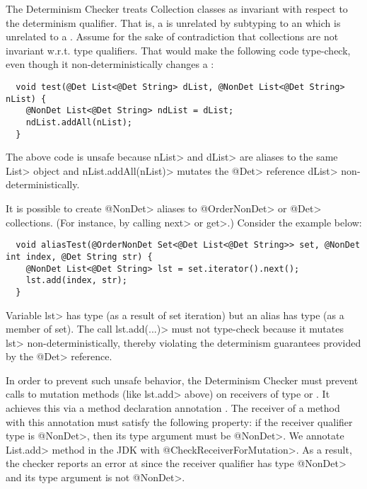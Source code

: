 The Determinism Checker treats Collection classes as
invariant with respect to the determinism qualifier. That is, a
 is unrelated by subtyping to an 
which is unrelated to a .
Assume for the sake of contradiction that collections are not invariant w.r.t. type qualifiers.
That would make the following code type-check, even though it
non-deterministically changes a :
\begin{Verbatim}
  void test(@Det List<@Det String> dList, @NonDet List<@Det String> nList) {
    @NonDet List<@Det String> ndList = dList;
    ndList.addAll(nList);
  }
\end{Verbatim}

The above code is unsafe because \<nList> and \<dList> are aliases to
the same \<List> object and \<nList.addAll(nList)> mutates the \<@Det>
reference \<dList> non-deterministically.

It is possible to create \<@NonDet> aliases to \<@OrderNonDet> or \<@Det> collections.
(For instance, by calling \<next> or \<get>.) Consider the example below:
\begin{Verbatim}
  void aliasTest(@OrderNonDet Set<@Det List<@Det String>> set, @NonDet int index, @Det String str) {
    @NonDet List<@Det String> lst = set.iterator().next();
    lst.add(index, str);
  }
\end{Verbatim}

Variable \<lst> has type  (as a result of set iteration)
but an alias has type  (as a member of set).
The call \<lst.add(...)> must not type-check because it mutates \<lst> non-deterministically,
thereby violating the determinism guarantees provided by the \<@Det> reference.

In order to prevent such unsafe behavior, the Determinism Checker must
prevent calls to mutation methods (like \<lst.add> above) on receivers of
type  or .
It achieves this via a method declaration annotation
.
The receiver of a method with this annotation must satisfy the following property: if the
receiver qualifier type is \<@NonDet>, then its type argument must be \<@NonDet>.
We annotate \<List.add> method in the JDK with \<@CheckReceiverForMutation>.
As a result, the checker reports an error at 
since the receiver qualifier has type \<@NonDet> and its type argument is not \<@NonDet>.

